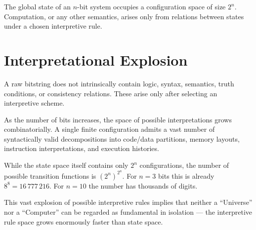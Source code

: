 The global state of an $n$-bit system occupies a configuration space of size $2^n$.
Computation, or any other semantics, arises only from relations between states under a chosen interpretive rule.


\section{Interpretational Explosion}

A raw bitstring does not intrinsically contain logic, syntax, semantics, truth conditions, or consistency relations.
These arise only after selecting an interpretive scheme.

As the number of bits increases, the space of possible interpretations grows combinatorially.
A single finite configuration admits a vast number of syntactically valid decompositions into code/data partitions, memory layouts, instruction interpretations, and execution histories.

While the state space itself contains only $2^n$ configurations, the number of possible transition functions is $(2^n)^{2^n}$.
For $n=3$ bits this is already $8^8 = 16\,777\,216$.
For $n=10$ the number has thousands of digits.

This vast explosion of possible interpretive rules implies that neither a ``Universe'' nor a ``Computer'' can be regarded as fundamental in isolation —
the interpretive rule space grows enormously faster than state space.

